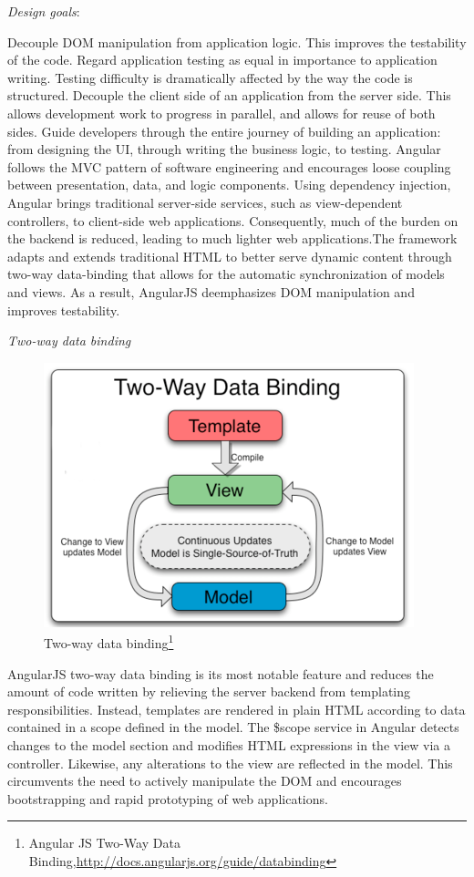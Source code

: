 	\emph{Design goals}:

	Decouple DOM manipulation from application logic. This improves the testability of the code.
	Regard application testing as equal in importance to application writing. Testing difficulty is dramatically affected by the way the code is structured.
	Decouple the client side of an application from the server side. This allows development work to progress in parallel, and allows for reuse of both sides.
	Guide developers through the entire journey of building an application: from designing the UI, through writing the business logic, to testing.
	Angular follows the MVC pattern of software engineering and encourages loose coupling between presentation, data, and logic components. Using dependency injection, Angular brings traditional server-side services, such as view-dependent controllers, to client-side web applications. Consequently, much of the burden on the backend is reduced, leading to much lighter web applications.The framework adapts and extends traditional HTML to better serve dynamic content through two-way data-binding that allows for the automatic synchronization of models and views. As a result, AngularJS deemphasizes DOM manipulation and improves testability.

   \emph{Two-way data binding}
   \begin{figure}[!ht]
		\centering
		\includegraphics[scale=0.8]{images/2wayBinding.png}   
		\caption[Two-way data binding]{Two-way data binding\footnote{Angular JS Two-Way Data Binding,\url{http://docs.angularjs.org/guide/databinding}}}
		\label{img:interfaces}                           
		\end{figure}
	AngularJS two-way data binding is its most notable feature and reduces the amount of code written by relieving the server backend from templating responsibilities. Instead, templates are rendered in plain HTML according to data contained in a scope defined in the model. The \$scope service in Angular detects changes to the model section and modifies HTML expressions in the view via a controller. Likewise, any alterations to the view are reflected in the model. This circumvents the need to actively manipulate the DOM and encourages bootstrapping and rapid prototyping of web applications.


